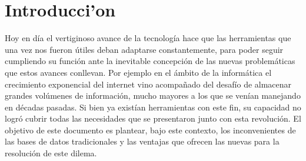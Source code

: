 \documentclass[11pt,a4paper]{article}
\begin{document}
\newpage
\thispagestyle{empty}
\tableofcontents

\parskip=5pt
\setlength{\parindent}{0pt}

\newpage
\setcounter{page}{1}
\pagestyle{plain}

\section{Introducci'on}
Hoy en día el vertiginoso avance de la tecnología hace que las herramientas que una vez nos fueron útiles deban adaptarse constantemente, para poder seguir cumpliendo su función ante la inevitable concepción de las nuevas problemáticas que estos avances conllevan. Por ejemplo en el ámbito de la informática el crecimiento exponencial del internet vino acompañado del desafío de almacenar grandes volúmenes de información, mucho mayores a los que se venían manejando en décadas pasadas. Si bien ya existían herramientas con este fin, su capacidad no logró cubrir todas las necesidades que se presentaron junto con esta revolución. El objetivo de este documento es plantear, bajo este contexto, los inconvenientes de las bases de datos tradicionales y las ventajas que ofrecen las nuevas para la resolución de este dilema.	
\end{document}
